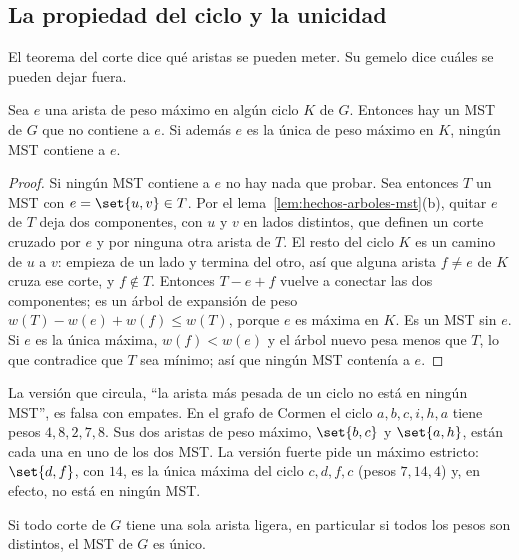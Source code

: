 \documentclass[11pt,letterpaper]{article}
\begin{document}

\subsection*{La propiedad del ciclo y la unicidad}

El teorema del corte dice qué aristas se pueden meter. Su gemelo dice
cuáles se pueden dejar fuera.

\begin{lema}
  \label{lem:propiedad-ciclo}
  Sea $e$ una arista de peso máximo en algún ciclo $K$ de $G$.
  Entonces hay un MST de $G$ que no contiene a $e$. Si además $e$ es
  la única de peso máximo en $K$, ningún MST contiene a $e$.
\end{lema}

\begin{proof}
  Si ningún MST contiene a $e$ no hay nada que probar. Sea entonces $T$
  un MST con $e = \set{u, v} \in T$. Por el
  lema~\ref{lem:hechos-arboles-mst}(b), quitar $e$ de $T$ deja dos
  componentes, con $u$ y $v$ en lados distintos, que definen un corte
  cruzado por $e$ y por ninguna otra arista de $T$. El resto del ciclo
  $K$ es un camino de $u$ a $v$: empieza de un lado y termina del
  otro, así que alguna arista $f \neq e$ de $K$ cruza ese corte, y
  $f \notin T$. Entonces $T - e + f$ vuelve a conectar las dos
  componentes; es un árbol de expansión de peso
  $w(T) - w(e) + w(f) \le w(T)$, porque $e$ es máxima en $K$. Es un
  MST sin $e$. Si $e$ es la única máxima, $w(f) < w(e)$ y el árbol
  nuevo pesa menos que $T$, lo que contradice que $T$ sea mínimo; así
  que ningún MST contenía a $e$.
\end{proof}

\begin{ojo}
  La versión que circula, ``la arista más pesada de un ciclo no está en
  ningún MST'', es falsa con empates. En el grafo de Cormen el ciclo
  $a, b, c, i, h, a$ tiene pesos $4, 8, 2, 7, 8$. Sus dos aristas de
  peso máximo, $\set{b,c}$ y $\set{a,h}$, están cada una en uno de los
  dos MST. La versión fuerte pide un máximo estricto: $\set{d,f}$, con
  $14$, es la única máxima del ciclo $c, d, f, c$ (pesos $7, 14, 4$) y,
  en efecto, no está en ningún MST.
\end{ojo}

\begin{teorema}
  \label{teo:unicidad-mst}
  Si todo corte de $G$ tiene una sola arista ligera, en particular si
  todos los pesos son distintos, el MST de $G$ es único.
\end{teorema}
\end{document}
